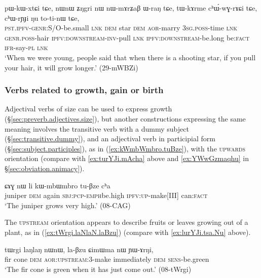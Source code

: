 \begin{exe}
\ex \label{ex:tWkArme.chWrYi}
\gll pɯ-kɯ-xtɕi tɕe, nɯnɯ ʑŋgri nɯ nɯ-mɤrʑaβ ɯ-raŋ tɕe, tɯ-kɤrme cʰɯ́-wɣ-rɤɕi tɕe, cʰɯ-rɲɟi ŋu to-ti-nɯ tɕe,\\
\textsc{pst}.\textsc{ipfv}-\textsc{genr}:S/O-be.small \textsc{lnk} \textsc{dem} star \textsc{dem}  \textsc{aor}-marry \textsc{3sg}.\textsc{poss}-time \textsc{lnk} \textsc{genr}.\textsc{poss}-hair \textsc{ipfv}:\textsc{downstream}-\textsc{inv}-pull \textsc{lnk} \textsc{ipfv}:\textsc{downstream}-be.long be:\textsc{fact} \textsc{ifr}-say-\textsc{pl} \textsc{lnk} \\
\glt `When we were young, people said that when there is a shooting star, if you pull your hair, it will grow longer.' (29-mWBZi)
 \end{exe}

\subsubsection{Verbs related to growth, gain or birth} \label{sec:preverb.gain}
Adjectival verbs of size can be used to express growth (§\ref{sec:preverb.adjectives.size}), but another constructions expressing the same meaning involves the transitive verb  with a dummy subject (§\ref{sec:transitive.dummy}), and an adjectival verb in participial form (§\ref{sec:subject.participles}), as in (\ref{ex:kWmbWmbro.tuBze}), with the \textsc{upwards} orientation (compare with \ref{ex:turYJi.mAcha} above and \ref{ex:YWwGzmaqhu} in §\ref{sec:obviation.animacy}).
 

\begin{exe}
\ex \label{ex:kWmbWmbro.tuBze}
\gll ɕɤɣ nɯ li kɯ-mbɯ\redp{}mbro tu-βze cʰa \\
juniper \textsc{dem} again \textsc{sbj}:\textsc{pcp}-\textsc{emph}\redp{}be.high \textsc{ipfv}:\textsc{up}-make[III] can:\textsc{fact} \\
\glt `The juniper grows very high.' (08-CAG) 
 \end{exe}
 
The \textsc{upstream} orientation appears to describe fruits or leaves growing out of a plant, as in (\ref{ex:tWrgi.laNlaN.laBzu})  (compare with \ref{ex:lurYJi.tsa.Nu} above).
 
 \begin{exe}
\ex \label{ex:tWrgi.laNlaN.laBzu}
\gll  tɯrgi laŋlaŋ nɯnɯ, la-βzu ɕimɯma nɯ ɲɯ-ɤrŋi, \\
fir cone \textsc{dem} \textsc{aor}:\textsc{upstream}:3\flobv{}-make immediately \textsc{dem} \textsc{sens}-be.green \\
\glt `The fir cone is green when it has just come out.' (08-tWrgi)
  \end{exe}

